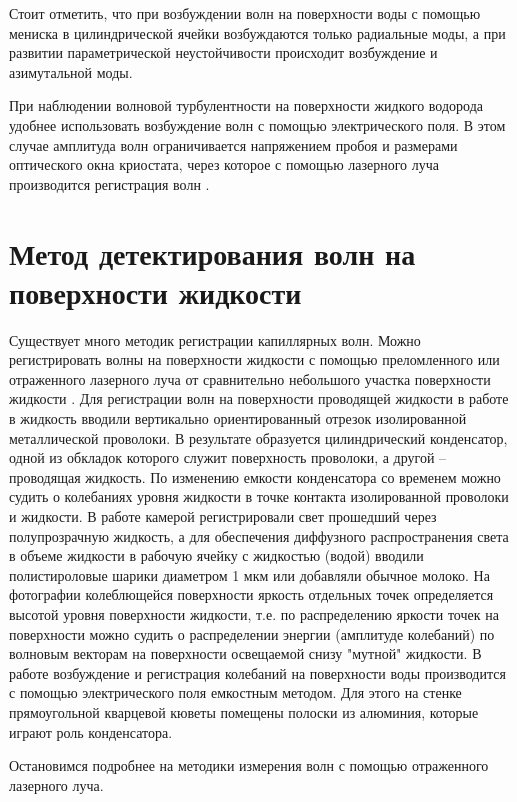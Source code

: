 Стоит отметить, что при возбуждении волн на поверхности воды с помощью мениска в цилиндрической ячейки возбуждаются только радиальные моды, а при развитии параметрической неустойчивости происходит возбуждение и азимутальной моды.



При наблюдении волновой турбулентности на поверхности жидкого водорода удобнее использовать возбуждение волн с помощью электрического поля. В этом случае амплитуда волн ограничивается напряжением пробоя и размерами оптического окна криостата, через которое с помощью лазерного луча производится регистрация волн \cite{Brazhnikov2002}.


\section{Метод детектирования волн на поверхности жидкости}\label{p1_methodDetect}

Существует много методик регистрации капиллярных волн. Можно регистрировать волны на поверхности жидкости с помощью преломленного или отраженного лазерного луча от сравнительно небольшого участка поверхности жидкости \cite{Brazhnikov_IET}. Для регистрации волн на поверхности проводящей жидкости в работе \cite{Falcon2007} в жидкость вводили вертикально ориентированный отрезок изолированной металлической проволоки. В результате образуется цилиндрический конденсатор, одной из обкладок которого служит поверхность проволоки, а другой – проводящая жидкость. По изменению емкости конденсатора со временем можно судить о колебаниях уровня жидкости в точке контакта изолированной проволоки и жидкости.
В работе \cite{Wright1996, Henry2000} камерой регистрировали свет прошедший через полупрозрачную жидкость, а для обеспечения диффузного распространения света в объеме жидкости в рабочую ячейку с жидкостью (водой) вводили полистироловые шарики диаметром 1 мкм или добавляли обычное молоко. На фотографии колеблющейся поверхности яркость отдельных точек определяется высотой уровня поверхности жидкости, т.е. по распределению яркости точек на поверхности можно судить о распределении энергии (амплитуде колебаний) по волновым векторам на поверхности освещаемой снизу "мутной"  жидкости. В работе \cite{Fujimura2008} возбуждение и регистрация колебаний на поверхности воды производится с помощью электрического поля емкостным методом. Для этого на стенке прямоугольной кварцевой кюветы помещены полоски из алюминия, которые играют роль конденсатора.

Остановимся подробнее на методики измерения волн с помощью отраженного лазерного луча.

